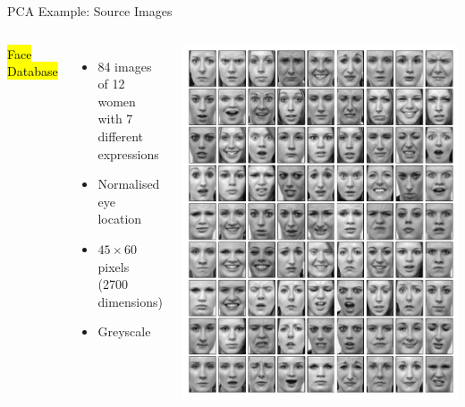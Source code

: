 \documentclass[handout,aspectratio=169]{beamer}
\begin{document}
	\begin{frame}{PCA Example: Source Images}
		\centering
		\begin{columns}[c]
			\hl{Face Database}
			\begin{itemize}
				\item 84 images of 12 women\\with 7 different expressions
				\item Normalised eye location
				\item $45 \times 60$ pixels\\(2700 dimensions)
				\item Greyscale
			\end{itemize}
			\includegraphics[width=\textwidth]{media/face_database.pdf}
		\end{columns}
	\end{frame}
\end{document}
